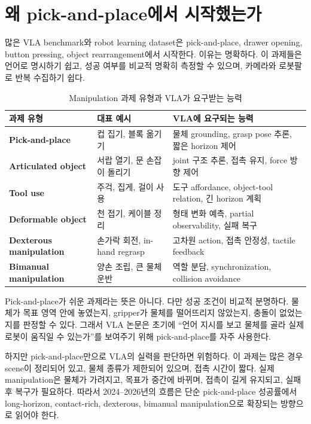 \section{왜 pick-and-place에서 시작했는가}

많은 VLA benchmark와 robot learning dataset은 pick-and-place, drawer opening, button pressing, object rearrangement에서 시작한다. 이유는 명확하다. 이 과제들은 언어로 명시하기 쉽고, 성공 여부를 비교적 명확히 측정할 수 있으며, 카메라와 로봇팔로 반복 수집하기 쉽다.

\begin{table}[t]
  \centering
  \caption{Manipulation 과제 유형과 VLA가 요구받는 능력}
  \label{tab:manipulation_types}
  \begin{tabularx}{\textwidth}{>{\bfseries}p{32mm}p{32mm}X}
    \toprule
    과제 유형 & 대표 예시 & VLA에 요구되는 능력 \\
    \midrule
    Pick-and-place & 컵 집기, 블록 옮기기 & 물체 grounding, grasp pose 추론, 짧은 horizon 제어 \\
    Articulated object & 서랍 열기, 문 손잡이 돌리기 & joint 구조 추론, 접촉 유지, force 방향 제어 \\
    Tool use & 주걱, 집게, 걸이 사용 & 도구 affordance, object-tool relation, 긴 horizon 계획 \\
    Deformable object & 천 접기, 케이블 정리 & 형태 변화 예측, partial observability, 실패 복구 \\
    Dexterous manipulation & 손가락 회전, in-hand regrasp & 고차원 action, 접촉 안정성, tactile feedback \\
    Bimanual manipulation & 양손 조립, 큰 물체 운반 & 역할 분담, synchronization, collision avoidance \\
    \bottomrule
  \end{tabularx}
\end{table}

Pick-and-place가 쉬운 과제라는 뜻은 아니다. 다만 성공 조건이 비교적 분명하다. 물체가 목표 영역 안에 놓였는지, gripper가 물체를 떨어뜨리지 않았는지, 충돌이 없었는지를 판정할 수 있다. 그래서 VLA 논문은 초기에 ``언어 지시를 보고 물체를 골라 실제 로봇이 움직일 수 있는가''를 보여주기 위해 pick-and-place를 자주 사용한다.

하지만 pick-and-place만으로 VLA의 실력을 판단하면 위험하다. 이 과제는 많은 경우 scene이 정리되어 있고, 물체 종류가 제한되어 있으며, 접촉 시간이 짧다. 실제 manipulation은 물체가 가려지고, 목표가 중간에 바뀌며, 접촉이 길게 유지되고, 실패 후 복구가 필요하다. 따라서 2024--2026년의 흐름은 단순 pick-and-place 성공률에서 long-horizon, contact-rich, dexterous, bimanual manipulation으로 확장되는 방향으로 읽어야 한다.

